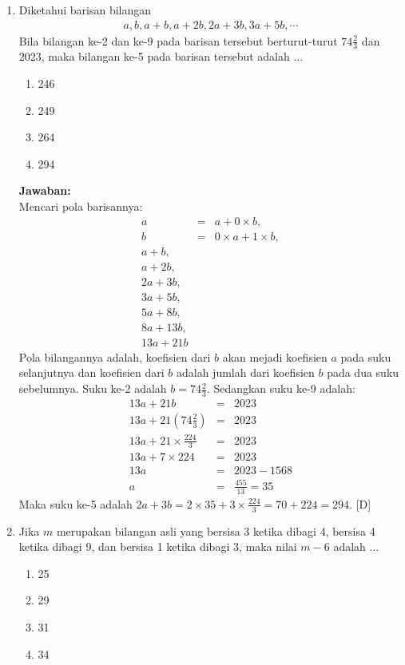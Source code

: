 \documentclass{article}
\begin{document}
\begin{enumerate}
  \item Diketahui barisan bilangan
  \begin{eqnarray*}
    a,b,a+b,a+2b,2a+3b,3a+5b, \cdots
  \end{eqnarray*}
  Bila bilangan ke-2 dan ke-9 pada barisan tersebut berturut-turut $74\frac{2}{3}$ dan 2023,  maka bilangan ke-5 pada barisan tersebut adalah ...
  \begin{enumerate}
        \item[(A)] 246
        \item[(B)] 249
        \item[(C)] 264
        \item[(D)] 294
    \end{enumerate}
  \textbf{Jawaban:}\\
  Mencari pola barisannya:
  \begin{eqnarray*}
    a &=& a+0\times b, \\
    b &=& 0\times a + 1\times b, \\
    a+b, && \\
    a+2b, && \\
    2a+3b, &&\\
    3a+5b, &&\\
    5a+8b, &&\\
    8a+13b, && \\
    13a+21b &&
  \end{eqnarray*}
  Pola bilangannya adalah, koefisien dari $b$ akan mejadi koefisien $a$ pada suku selanjutnya dan koefisien dari $b$ adalah jumlah dari koefisien $b$ pada dua suku sebelumnya. Suku ke-2 adalah $b=74\frac{2}{3}$. Sedangkan suku ke-9 adalah:
  \begin{eqnarray*}
    13a+21b &=& 2023 \\
    13a+21\left(74\frac{2}{3}\right) &=& 2023 \\
    13a+21\times \frac{224}{3} &=& 2023\\
    13a+ 7\times 224 &=& 2023\\
    13a &=& 2023-1568 \\
    a &=& \frac{455}{13}=35
  \end{eqnarray*}
  Maka suku ke-5 adalah $2a+3b=2\times 35 + 3\times \frac{224}{3}=70+224=294$. [D]
  
  \item Jika $m$ merupakan bilangan asli yang bersisa 3 ketika dibagi 4, bersisa 4 ketika dibagi 9, dan bersisa 1 ketika dibagi 3, maka nilai $m-6$ adalah ...
  \begin{enumerate}
        \item[(A)] 25
        \item[(B)] 29
        \item[(C)] 31
        \item[(D)] 34
    \end{enumerate}
    

\end{enumerate}
\end{document}
